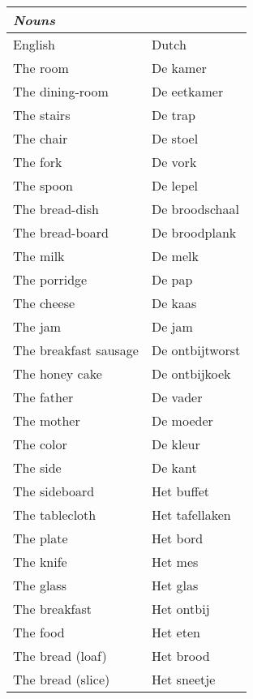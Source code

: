 \documentclass[letterpaper,11pt]{article}
\begin{document}
\begin{tabular}[t]{|l | l|}
    \hline
    \textit{Nouns}        &                 \\
    \hline
    English               & Dutch           \\
    \hline
    The room              & De kamer        \\
    The dining-room       & De eetkamer     \\
    The stairs            & De trap         \\
    The chair             & De stoel        \\
    The fork              & De vork         \\
    The spoon             & De lepel        \\
    The bread-dish        & De broodschaal  \\
    The bread-board       & De broodplank   \\
    The milk              & De melk         \\
    The porridge          & De pap          \\
    The cheese            & De kaas         \\
    The jam               & De jam          \\
    The breakfast sausage & De ontbijtworst \\
    The honey cake        & De ontbijkoek   \\
    The father            & De vader        \\
    The mother            & De moeder       \\
    The color             & De kleur        \\
    The side              & De kant         \\
    The sideboard         & Het buffet      \\
    The tablecloth        & Het tafellaken  \\
    The plate             & Het bord        \\
    The knife             & Het mes         \\
    The glass             & Het glas        \\
    The breakfast         & Het ontbij      \\
    The food              & Het eten        \\
    The bread (loaf)      & Het brood       \\
    The bread (slice)     & Het sneetje     \\

\end{tabular}
\end{document}
